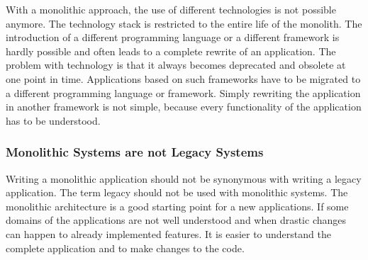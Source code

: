 \bigskip

\noindent With a monolithic approach, the use of different technologies is not possible anymore. The technology stack is restricted to the entire life of the monolith. The introduction of a different programming language or a different framework is hardly possible and often leads to a complete rewrite of an application. \cite[6-7]{book:2018:richardson:background:bff:microservices-patterns} The problem with technology is that it always becomes deprecated and obsolete at one point in time. Applications based on such frameworks have to be migrated to a different programming language or framework. Simply rewriting the application in another framework is not simple, because every functionality of the application has to be understood.

\subsubsection{Monolithic Systems are not Legacy Systems}

Writing a monolithic application should not be synonymous with writing a legacy application. The term legacy should not be used with monolithic systems. \cite[15]{book:2019:newman:background:monolith:monolith-to-microservices} The monolithic architecture is a good starting point for a new applications. If some domains of the applications are not well understood and when drastic changes can happen to already implemented features. It is easier to understand the complete application and to make changes to the code. \cite[43]{book:2019:newman:background:monolith:monolith-to-microservices}
